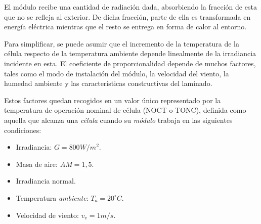 El módulo recibe una cantidad de radiación dada, absorbiendo la fracción de esta que no se refleja al exterior. De dicha fracción, parte de ella es transformada en energía eléctrica mientras que el resto se entrega en forma de calor al entorno.

Para simplificar, se puede asumir que el incremento de la temperatura de la célula respecto de la temperatura ambiente depende linealmente de la irradiancia incidente en esta. El coeficiente de proporcionalidad depende de muchos factores, tales como el modo de instalación del módulo, la velocidad del viento, la humedad ambiente y las características constructivas del laminado.

Estos factores quedan recogidos en un valor único representado por la temperatura de operación nominal de célula (NOCT o TONC), definida como aquella que alcanza una \emph{célula} cuando su \emph{módulo} trabaja en las siguientes condiciones:
\begin{itemize}
\item Irradiancia: \(G=800W/m^2\).
\item Masa de aire: \(AM= 1,5\).
\item Irradiancia normal.
\item Temperatura \emph{ambiente}: \(T_a=20^\circ C\).
\item Velocidad de viento: \(v_v=1m/s\).
\end{itemize}

